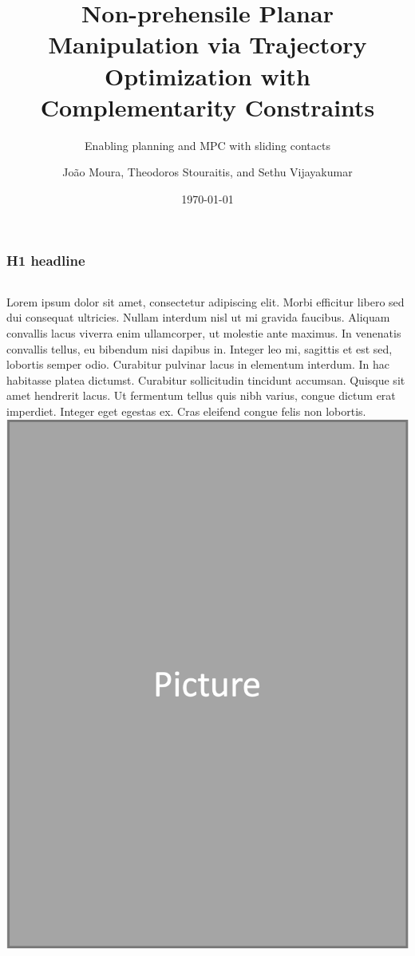 \documentclass[aspectratio=169]{beamer}
\title[Non-prehensile Planar Manipulation via TO with CC]{Non-prehensile Planar Manipulation via Trajectory Optimization with Complementarity Constraints}
\subtitle{Enabling planning and MPC with sliding contacts}
\author{Jo\~{a}o Moura, Theodoros Stouraitis, and Sethu Vijayakumar}
\date{\today}
\begin{document}
\begin{frame}
  \maketitle
\end{frame}

\begin{frame}
  \frametitle{H1 headline}
  \begin{columns}
      \footnotesize
      Lorem ipsum dolor sit amet, consectetur adipiscing elit. Morbi efficitur libero sed dui consequat ultricies. Nullam interdum nisl ut mi gravida faucibus. Aliquam convallis lacus viverra enim ullamcorper, ut molestie ante maximus. In venenatis convallis tellus, eu bibendum nisi dapibus in. Integer leo mi, sagittis et est sed, lobortis semper odio. Curabitur pulvinar lacus in elementum interdum. In hac habitasse platea dictumst. Curabitur sollicitudin tincidunt accumsan. Quisque sit amet hendrerit lacus.  Ut fermentum tellus quis nibh varius, congue dictum erat imperdiet. Integer eget egestas ex. Cras eleifend congue felis non lobortis.
    \includegraphics[width=\textwidth]{Picture.png}
  \end{columns}
\end{frame}
\end{document}
